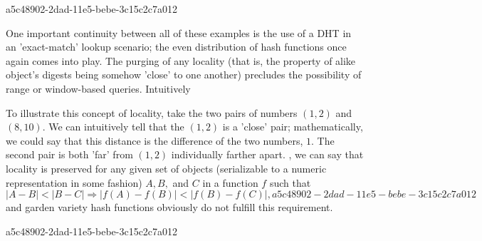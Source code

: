 \documentclass[12pt]{article}
\begin{document}
a5c48902-2dad-11e5-bebe-3c15c2c7a012\par One important continuity between all of these examples is the use of a DHT in an 'exact-match' lookup scenario; the even distribution of hash functions once again comes into play. The purging of any locality (that is, the property of alike object's digests being somehow 'close' to one another) precludes the possibility of range or window-based queries. Intuitively

\par To illustrate this concept of locality, take the two pairs of numbers $(1,2)$ and $(8,10)$. We can intuitively tell that the $(1,2)$ is a 'close' pair; mathematically, we could say that this distance is the difference of the two numbers, $1$. The second pair is both 'far' from $(1,2)$ individually farther apart. , we can say that locality is preserved for any given set of objects (serializable to a numeric representation in some fashion) $A,B,$ and $C$ in a function $f$ such that
\begin{equation}
|A-B| < |B-C| \Rightarrow |f(A)-f(B)| < |f(B) - f(C)|,
a5c48902-2dad-11e5-bebe-3c15c2c7a012\end{equation}
and garden variety hash functions obviously do not fulfill this requirement.

a5c48902-2dad-11e5-bebe-3c15c2c7a012\printbibliography
\end{document}
